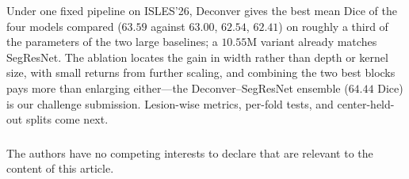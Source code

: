 \documentclass[runningheads,a4paper]{llncs}
\begin{document}
Under one fixed pipeline on ISLES'26, Deconver gives the best mean Dice of the four models compared ($63.59$ against $63.00$, $62.54$, $62.41$) on roughly a third of the parameters of the two large baselines; a $10.55$M variant already matches SegResNet. The ablation locates the gain in width rather than depth or kernel size, with small returns from further scaling, and combining the two best blocks pays more than enlarging either---the Deconver--SegResNet ensemble ($64.44$ Dice) is our challenge submission. Lesion-wise metrics, per-fold tests, and center-held-out splits come next.

\begin{credits}
\subsubsection{\discintname}
The authors have no competing interests to declare that are relevant to the content of this article.
\end{credits}



%
\end{document}
